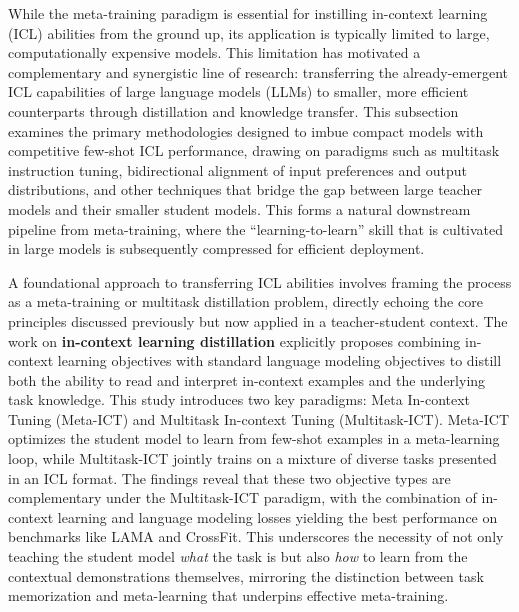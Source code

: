 \documentclass[11pt]{article}
\begin{document}
While the meta-training paradigm is essential for instilling in-context learning (ICL) abilities from the ground up, its application is typically limited to large, computationally expensive models. This limitation has motivated a complementary and synergistic line of research: transferring the already-emergent ICL capabilities of large language models (LLMs) to smaller, more efficient counterparts through distillation and knowledge transfer. This subsection examines the primary methodologies designed to imbue compact models with competitive few-shot ICL performance, drawing on paradigms such as multitask instruction tuning, bidirectional alignment of input preferences and output distributions, and other techniques that bridge the gap between large teacher models and their smaller student models. This forms a natural downstream pipeline from meta-training, where the ``learning-to-learn'' skill that is cultivated in large models is subsequently compressed for efficient deployment.

A foundational approach to transferring ICL abilities involves framing the process as a meta-training or multitask distillation problem, directly echoing the core principles discussed previously but now applied in a teacher-student context. The work on \textbf{in-context learning distillation} \cite{ref193} explicitly proposes combining in-context learning objectives with standard language modeling objectives to distill both the ability to read and interpret in-context examples and the underlying task knowledge. This study introduces two key paradigms: Meta In-context Tuning (Meta-ICT) and Multitask In-context Tuning (Multitask-ICT). Meta-ICT optimizes the student model to learn from few-shot examples in a meta-learning loop, while Multitask-ICT jointly trains on a mixture of diverse tasks presented in an ICL format. The findings reveal that these two objective types are complementary under the Multitask-ICT paradigm, with the combination of in-context learning and language modeling losses yielding the best performance on benchmarks like LAMA and CrossFit. This underscores the necessity of not only teaching the student model \emph{what} the task is but also \emph{how} to learn from the contextual demonstrations themselves, mirroring the distinction between task memorization and meta-learning that underpins effective meta-training.
\end{document}
